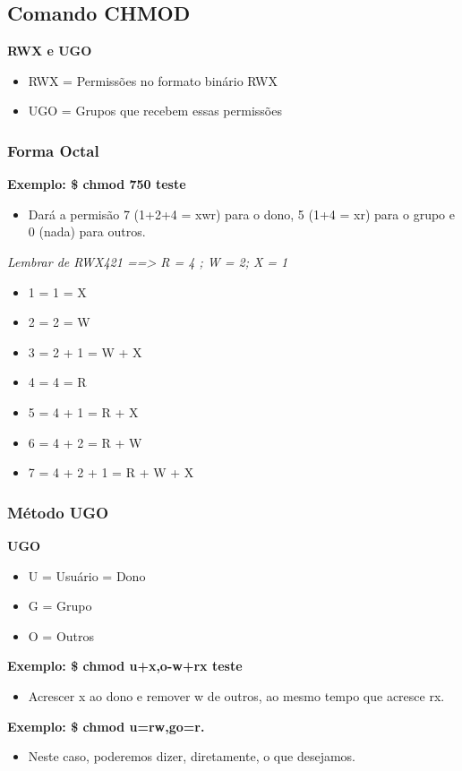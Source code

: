 \subsection{Comando CHMOD}

\textbf{RWX e UGO}
\begin{itemize}
	\item RWX = Permissões no formato binário RWX
	\item UGO = Grupos que recebem essas permissões
\end{itemize}


\subsubsection{Forma Octal}

\textbf{Exemplo: \$ chmod 750 teste}
\begin{itemize}
	\item Dará a permisão 7 (1+2+4 = xwr) para o dono, 5 (1+4 = xr) para o grupo e 0 (nada) para outros.
\end{itemize}

\begin{center}
	\emph{Lembrar de RWX421 ==> R = 4 ; W = 2; X = 1}
\end{center}

\begin{itemize}
	\item 1 = 1 = X
	\item 2 = 2 = W
	\item 3 = 2 + 1 = W + X
	\item 4 = 4 = R
	\item 5 = 4 + 1 = R + X
	\item 6 = 4 + 2 = R + W
	\item 7 = 4 + 2 + 1 = R + W + X
\end{itemize}

\subsubsection{Método UGO}

\textbf{UGO}
\begin{itemize}
	\item U = Usuário = Dono
	\item G = Grupo
	\item O = Outros
\end{itemize}

\textbf{Exemplo: \$ chmod u+x,o-w+rx teste}
\begin{itemize}
	\item Acrescer x ao dono e remover w de outros, ao mesmo tempo que acresce rx.
\end{itemize}

\textbf{Exemplo: \$ chmod u=rw,go=r.}
\begin{itemize}
	\item Neste caso, poderemos dizer, diretamente, o que desejamos.
\end{itemize}

